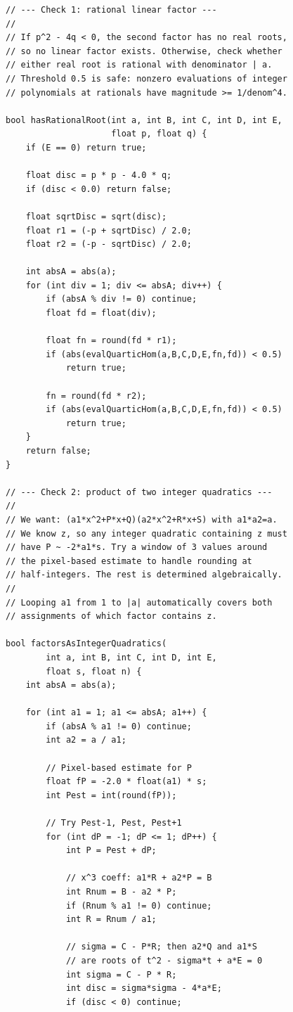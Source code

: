 \documentclass[11pt]{article}
\begin{document}
\begin{lstlisting}
// --- Check 1: rational linear factor ---
//
// If p^2 - 4q < 0, the second factor has no real roots,
// so no linear factor exists. Otherwise, check whether
// either real root is rational with denominator | a.
// Threshold 0.5 is safe: nonzero evaluations of integer
// polynomials at rationals have magnitude >= 1/denom^4.

bool hasRationalRoot(int a, int B, int C, int D, int E,
                     float p, float q) {
    if (E == 0) return true;

    float disc = p * p - 4.0 * q;
    if (disc < 0.0) return false;

    float sqrtDisc = sqrt(disc);
    float r1 = (-p + sqrtDisc) / 2.0;
    float r2 = (-p - sqrtDisc) / 2.0;

    int absA = abs(a);
    for (int div = 1; div <= absA; div++) {
        if (absA % div != 0) continue;
        float fd = float(div);

        float fn = round(fd * r1);
        if (abs(evalQuarticHom(a,B,C,D,E,fn,fd)) < 0.5)
            return true;

        fn = round(fd * r2);
        if (abs(evalQuarticHom(a,B,C,D,E,fn,fd)) < 0.5)
            return true;
    }
    return false;
}

// --- Check 2: product of two integer quadratics ---
//
// We want: (a1*x^2+P*x+Q)(a2*x^2+R*x+S) with a1*a2=a.
// We know z, so any integer quadratic containing z must
// have P ~ -2*a1*s. Try a window of 3 values around
// the pixel-based estimate to handle rounding at
// half-integers. The rest is determined algebraically.
//
// Looping a1 from 1 to |a| automatically covers both
// assignments of which factor contains z.

bool factorsAsIntegerQuadratics(
        int a, int B, int C, int D, int E,
        float s, float n) {
    int absA = abs(a);

    for (int a1 = 1; a1 <= absA; a1++) {
        if (absA % a1 != 0) continue;
        int a2 = a / a1;

        // Pixel-based estimate for P
        float fP = -2.0 * float(a1) * s;
        int Pest = int(round(fP));

        // Try Pest-1, Pest, Pest+1
        for (int dP = -1; dP <= 1; dP++) {
            int P = Pest + dP;

            // x^3 coeff: a1*R + a2*P = B
            int Rnum = B - a2 * P;
            if (Rnum % a1 != 0) continue;
            int R = Rnum / a1;

            // sigma = C - P*R; then a2*Q and a1*S
            // are roots of t^2 - sigma*t + a*E = 0
            int sigma = C - P * R;
            int disc = sigma*sigma - 4*a*E;
            if (disc < 0) continue;


\end{lstlisting}
\end{document}
